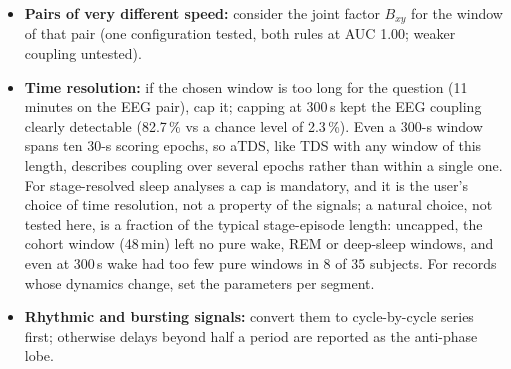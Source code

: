 \documentclass[11pt,a4paper]{article}
\begin{document}
\begin{itemize}
\item \textbf{Pairs of very different speed:} consider the joint factor $B_{xy}$ for the window of that pair (one configuration tested, both rules at AUC 1.00; weaker coupling untested).
\item \textbf{Time resolution:} if the chosen window is too long for the question (11 minutes on the EEG pair), cap it; capping at 300\,s kept the EEG coupling clearly detectable (82.7\,\% vs a chance level of 2.3\,\%). Even a 300-s window spans ten 30-s scoring epochs, so aTDS, like TDS with any window of this length, describes coupling over several epochs rather than within a single one. For stage-resolved sleep analyses a cap is mandatory, and it is the user's choice of time resolution, not a property of the signals; a natural choice, not tested here, is a fraction of the typical stage-episode length: uncapped, the cohort window (48\,min) left no pure wake, REM or deep-sleep windows, and even at 300\,s wake had too few pure windows in 8 of 35 subjects. For records whose dynamics change, set the parameters per segment.
\item \textbf{Rhythmic and bursting signals:} convert them to cycle-by-cycle series first; otherwise delays beyond half a period are reported as the anti-phase lobe.
\end{itemize}
\end{document}
